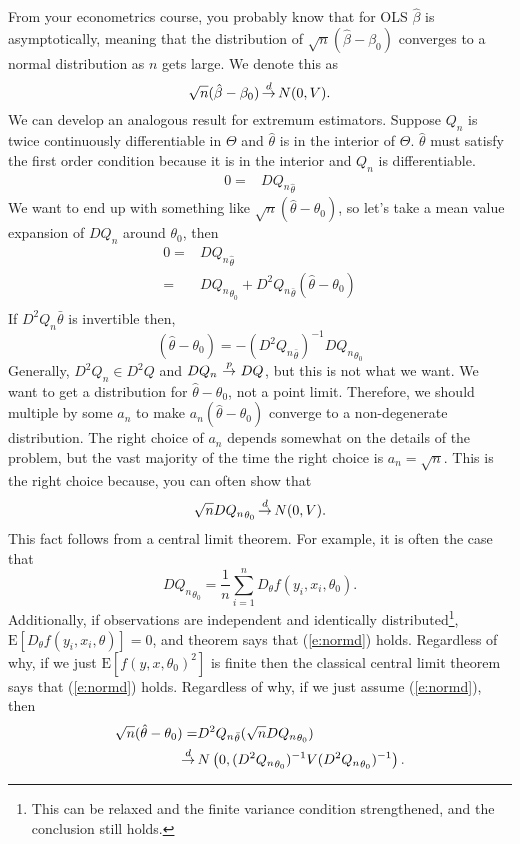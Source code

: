 \documentclass[12pt,reqno]{amsart}
\theoremstyle{definition}
\def\inprobHIGH{\,{\buildrel p \over \rightarrow}\,}
\def\inprob{\,{\inprobHIGH}\,}
\def\indist{\,{\buildrel d \over \rightarrow}\,}
\providecommand{\Er}{{\mathrm{E}}}
\begin{document}
From your econometrics course, you probably know that for OLS
$\hat{\beta}$ is asymptotically, meaning that the distribution of
$\sqrt{n}(\hat{\beta} - \beta_0)$ converges to a normal distribution
as $n$ gets large. We denote this as
\[ \sqrt{n}(\hat{\beta} - \beta_0) \indist N(0,V). \]
We can develop an analogous result for extremum estimators. Suppose
$Q_n$ is twice continuously differentiable in $\Theta$ and
$\hat{\theta}$ is in the interior of $\Theta$. $\hat{\theta}$ must
satisfy the first order condition because it is in the interior and
$Q_n$ is differentiable. 
\begin{align*}
  0 = & D {Q_n}_{\hat{\theta}} 
\end{align*}
We want to end up with something like $\sqrt{n}(\hat{\theta} -
\theta_0)$, so let's take a mean value expansion of $DQ_n$ around
$\theta_0$, then
\begin{align*}
  0 = & D {Q_n}_{\hat{\theta}} \\
  = & D{Q_n}_{\theta_0} + D^2
  {Q_n}_{\bar{\theta}} (\hat{\theta} - \theta_0) \\
\end{align*}
If $D^2Q_n{\bar{\theta}}$ is invertible then,
\[ (\hat{\theta} - \theta_0) =  -(D^2{Q_n}_{\bar{\theta}} )^{-1}
D{Q_n}_{\theta_0} \]   
Generally, $D^2 Q_n \in D^2 Q$ and $DQ_n \inprob DQ$, but this is not
what we want. We want to get a distribution for
$\hat{\theta}-\theta_0$, not a point limit. Therefore, we should
multiple by some $a_n$ to make $a_n(\hat{\theta}-\theta_0)$ converge
to a non-degenerate distribution. The right choice of $a_n$ depends
somewhat on the details of the problem, but the vast majority of the
time the right choice is $a_n = \sqrt{n}$. This is the right choice
because, you can often show that
\begin{align} 
  \sqrt{n} {DQ_n}_{\theta_0} \indist N(0,V). \label{e:normd} 
\end{align}
This fact follows from a central limit theorem. For example, it is
often the case that 
\[ D{Q_n}_{\theta_0} = \frac{1}{n} \sum_{i=1}^n D_\theta
f(y_i,x_i,\theta_0). \] 
Additionally, if observations are independent
and identically distributed\footnote{This can be relaxed and the
  finite variance condition strengthened, and the conclusion still
  holds.}, $\Er[D_\theta f(y_i,x_i,\theta)] = 0$, and
theorem says that (\ref{e:normd}) holds. Regardless of why, if we just
$\Er[f(y,x,\theta_0)^2]$ is finite then the classical central limit
theorem says that (\ref{e:normd}) holds. Regardless of why, if we just
assume (\ref{e:normd}), then
\begin{align*}
  \sqrt{n}(\hat{\theta} - \theta_0) = & D^2 {Q_n}_{\bar{\theta}}
  (\sqrt{n} D {Q_n}_{\theta_0} ) \\
  \indist & N\left(0, (D^2 {Q_n}_{\theta_0})^{-1} V (D^2
    {Q_n}_{\theta_0})^{-1} \right).
\end{align*}
\end{document}
